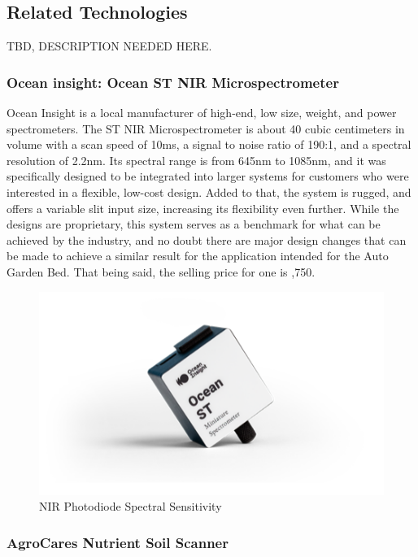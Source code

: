 \subsection{Related Technologies}
TBD, DESCRIPTION NEEDED HERE.
\subsubsection{Ocean insight: Ocean ST NIR Microspectrometer}



Ocean Insight is a local manufacturer of high-end, low size, weight, and power spectrometers. The ST NIR Microspectrometer is about 40 cubic centimeters in volume with a scan speed of 10ms, a signal to noise ratio of 190:1, and a spectral resolution of 2.2nm. Its spectral range is from 645nm to 1085nm, and it was specifically designed to be integrated into larger systems for customers who were interested in a flexible, low-cost design. Added to that, the system is rugged, and offers a variable slit input size, increasing its flexibility even further. While the designs are proprietary, this system serves as a benchmark for what can be achieved by the industry, and no doubt there are major design changes that can be made to achieve a similar result for the application intended for the Auto Garden Bed. That being said, the selling price for one is ,750.
\begin{figure}[H]
    \caption{NIR Photodiode Spectral Sensitivity}
    \centering
    \includegraphics[width=\textwidth]{images/3-2-1Pic.png}
\end{figure}
\subsubsection{AgroCares Nutrient Soil Scanner}

